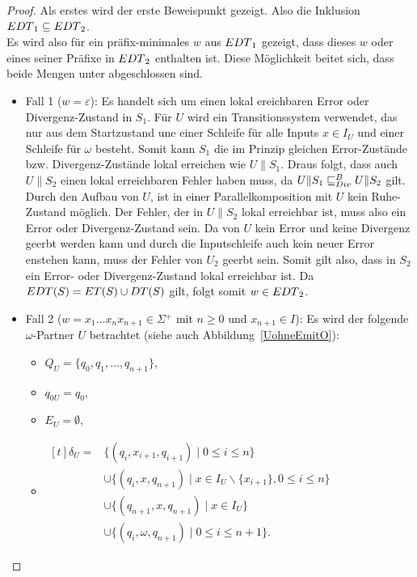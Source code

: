 \begin{proof}
  Als erstes wird der erste Beweispunkt gezeigt. Also die Inklusion
  $EDT{}_1\subseteq EDT{}_2$.\\
  Es wird also für ein präfix-minimales $w$ aus $EDT{}_1$ gezeigt, dass dieses
  $w$ oder eines seiner Präfixe in $EDT{}_2$ enthalten ist. Diese Möglichkeit
  beitet sich, dass beide Mengen unter \cont{} abgeschlossen sind.
  \begin{itemize}
    \item Fall 1 ($w=\varepsilon$): Es handelt sich um einen lokal ereichbaren
      Error oder Divergenz-Zustand in $S_1$. Für $U$ wird ein Transitionssystem
      verwendet, das nur aus dem Startzustand une einer Schleife für alle
      Inputs $x\in I_U$ und einer Schleife für $\omega$ besteht. Somit kann
      $S_1$ die im Prinzip gleichen Error-Zustände bzw. Divergenz-Zustände
      lokal erreichen wie $U\|S_1$. Draus folgt, dass auch $U\|S_2$ einen lokal
      erreichbaren Fehler haben muss, da $U\|S_1\sqsubseteq _{Div}^B U\|S_2$ gilt. Durch den
      Aufbau von $U$, ist in einer Parallelkomposition mit $U$ kein
      Ruhe-Zustand möglich. Der Fehler, der in $U\|S_2$ lokal erreichbar ist,
      muss also ein Error oder Divergenz-Zustand sein. Da von $U$ kein Error
      und keine Divergenz geerbt werden kann und durch die Inputschleife auch
      kein neuer Error enstehen kann, muss der Fehler von $U_2$ geerbt sein.
      Somit gilt also, dass in $S_2$ ein Error- oder Divergenz-Zustand lokal
      erreichbar ist. Da $EDT{}(S) = ET{}(S)\cup DT{}(S)$ gilt, folgt somit
      $w\in EDT{}_2$.
    \item Fall 2 ($w=x_1\dots x_nx_{n+1}\in\Sigma{} ^+$ mit $n\geq 0$ und
      $x_{n+1}\in I$): Es wird der folgende $\omega$-Partner $U$ betrachtet
      (siehe auch Abbildung~\ref{UohneEmitO}):
      \begin{itemize}
        \item $Q_U=\{q_0,q_1,\dots ,q_{n+1}\}$,
        \item $q_{0U}=q_0$,
        \item $E_U=\emptyset$,
        \item $\begin{aligned}[t]
            \delta _U=&\{(q_i,x_{i+1},q_{i+1})\mid  0\leq i\leq n\}\\
                      &\cup\{(q_i,x,q_{n+1})\mid  x\in I_U\backslash\{x_{i+1}\},
          0\leq i\leq n\}\\
          &\cup\{(q_{n+1},x,q_{n+1})\mid  x\in I_U\}\\
          &\cup\{(q_i,\omega ,q_{n+1})\mid 0\leq i\leq n+1\}.
        \end{aligned}$
      \end{itemize}
      \begin{figure} [h!tbp]
      \begin{center}
\end{center}
\end{figure}
\end{itemize}
\end{proof}
